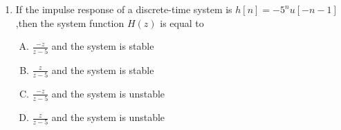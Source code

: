 \documentclass[journal,12pt,twocolumn]{IEEEtran}
\begin{document}
\begin{enumerate}
\setlength\itemsep{2em}

\item If the impulse response of a discrete-time system is $h[n]=-5^{n}u[-n-1]$,then the system function $H(z)$ is equal to
\begin{enumerate}[(A)]

\setlength\itemsep{1em}

\item $\frac{-z}{z-5}$ and the system is stable
\item $
\frac{z}{z-5}$ and the system is stable

\item $
\frac{-z}{z-5}$ and the system is unstable

\item $
\frac{z}{z-5}$ and the system is unstable

\end{enumerate}

%

%
%
%
%
%
%


\end{enumerate}
\end{document}
